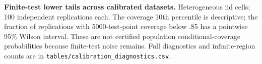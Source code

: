 \textbf{Finite-test lower tails across calibrated datasets.} Heterogeneous iid cells; 100 independent replications each. The coverage 10th percentile is descriptive; the fraction of replications with 5000-test-point coverage below .85 has a pointwise 95\% Wilson interval. These are not certified population conditional-coverage probabilities because finite-test noise remains. Full diagnostics and infinite-region counts are in \texttt{tables/calibration\_diagnostics.csv}.
